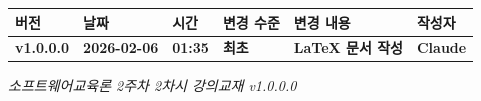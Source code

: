 \documentclass[11pt,a4paper]{article}
\begin{document}
\begin{center}
\begin{tabular}{|l|l|l|l|l|l|}
\hline
\rowcolor{lightblue}
\textbf{버전} & \textbf{날짜} & \textbf{시간} & \textbf{변경 수준} & \textbf{변경 내용} & \textbf{작성자} \\
\hline
\textbf{v1.0.0.0} & \textbf{2026-02-06} & \textbf{01:35} & \textbf{최초} & \textbf{LaTeX 문서 작성} & \textbf{Claude} \\
\hline
\end{tabular}
\end{center}

\vfill
\begin{center}
\textit{소프트웨어교육론 2주차 2차시 강의교재 v1.0.0.0}
\end{center}
\end{document}
